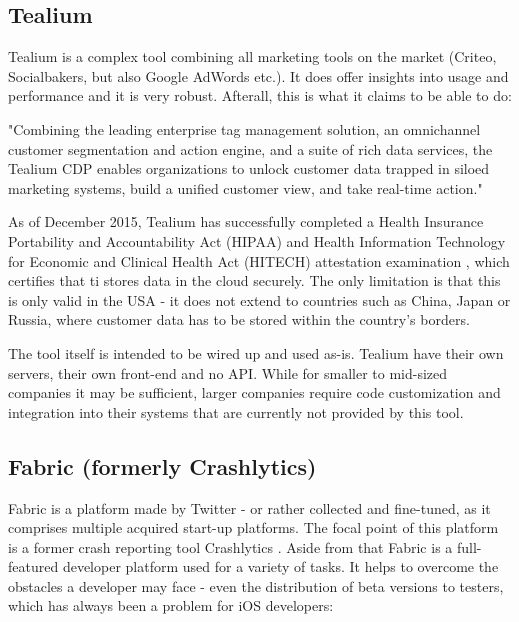 \subsection{Tealium}

Tealium is a complex tool combining all marketing tools on the market (Criteo, Socialbakers, but also Google AdWords etc.). It does offer insights into usage and performance and it is very robust. Afterall, this is what it claims to be able to do:

\bigbreak

"Combining the leading enterprise tag management solution, an omnichannel customer segmentation and action engine, and a suite of rich data services, the Tealium CDP enables organizations to unlock customer data trapped in siloed marketing systems, build a unified customer view, and take real-time action." \cite{tealium}

\bigbreak

As of December 2015, Tealium has successfully completed a Health Insurance Portability and Accountability Act (HIPAA) and Health Information Technology for Economic and Clinical Health Act (HITECH) attestation examination \cite{hipaa}, which certifies that ti stores data in the cloud securely. The only limitation is that this is only valid in the USA - it does not extend to countries such as China, Japan or Russia, where customer data has to be stored within the country's borders.

The tool itself is intended to be wired up and used as-is. Tealium have their own servers, their own front-end and no API. While for smaller to mid-sized companies it may be sufficient, larger companies require code customization and integration into their systems that are currently not provided by this tool.

\subsection{Fabric (formerly Crashlytics)}

Fabric is a platform made by Twitter - or rather collected and fine-tuned, as it comprises multiple acquired start-up platforms. The focal point of this platform is a former crash reporting tool Crashlytics \cite{crashlytics}. Aside from that Fabric is a full-featured developer platform used for a variety of tasks. It helps to overcome the obstacles a developer may face - even the distribution of beta versions to testers, which has always been a problem for iOS developers:


